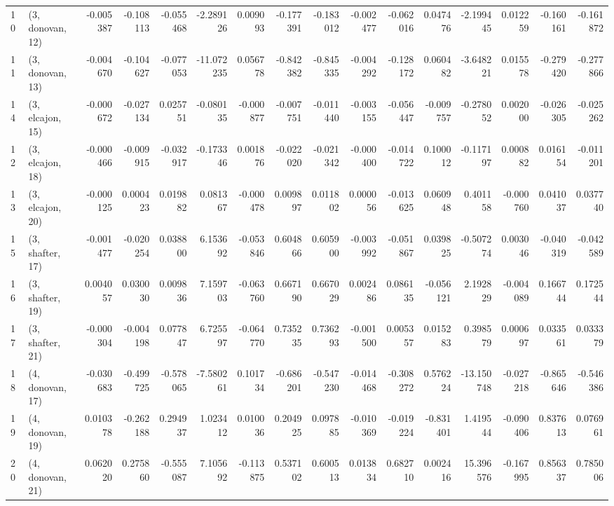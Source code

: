 \begin{tabular}{llrrrrrrrrrrrrrr}
10 &  (3, donovan, 12) &  -0.005387 & -0.108113 & -0.055468 &  -2.289126 &  0.009093 &  -0.177391 & -0.183012 & -0.002477 & -0.062016 &  0.047476 &  -2.199445 &  0.012259 & -0.160161 & -0.161872 \\
11 &  (3, donovan, 13) &  -0.004670 & -0.104627 & -0.077053 & -11.072235 &  0.056778 &  -0.842382 & -0.845335 & -0.004292 & -0.128172 &  0.060482 &  -3.648221 &  0.015578 & -0.279420 & -0.277866 \\
14 &  (3, elcajon, 15) &  -0.000672 & -0.027134 &  0.025751 &  -0.080135 & -0.000877 &  -0.007751 & -0.011440 & -0.003155 & -0.056447 & -0.009757 &  -0.278052 &  0.002000 & -0.026305 & -0.025262 \\
12 &  (3, elcajon, 18) &  -0.000466 & -0.009915 & -0.032917 &  -0.173346 &  0.001876 &  -0.022020 & -0.021342 & -0.000400 & -0.014722 &  0.100012 &  -0.117197 &  0.000882 &  0.016154 & -0.011201 \\
13 &  (3, elcajon, 20) &  -0.000125 &  0.000423 &  0.019882 &   0.081367 & -0.000478 &   0.009897 &  0.011802 &  0.000056 & -0.013625 &  0.060948 &   0.401158 & -0.000760 &  0.041037 &  0.037740 \\
15 &  (3, shafter, 17) &  -0.001477 & -0.020254 &  0.038800 &   6.153692 & -0.053846 &   0.604866 &  0.605900 & -0.003992 & -0.051867 &  0.039825 &  -0.507274 &  0.003046 & -0.040319 & -0.042589 \\
16 &  (3, shafter, 19) &   0.004057 &  0.030030 &  0.009836 &   7.159703 & -0.063760 &   0.667190 &  0.667029 &  0.002486 &  0.086135 & -0.056121 &   2.192829 & -0.004089 &  0.166744 &  0.172544 \\
17 &  (3, shafter, 21) &  -0.000304 & -0.004198 &  0.077847 &   6.725597 & -0.064770 &   0.735235 &  0.736293 & -0.001500 &  0.005357 &  0.015283 &   0.398579 &  0.000697 &  0.033561 &  0.033379 \\
18 &  (4, donovan, 17) &  -0.030683 & -0.499725 & -0.578065 &  -7.580261 &  0.101734 &  -0.686201 & -0.547230 & -0.014468 & -0.308272 &  0.576224 & -13.150748 & -0.027218 & -0.865646 & -0.546386 \\
19 &  (4, donovan, 19) &   0.010378 & -0.262188 &  0.294937 &   1.023412 &  0.010036 &   0.204925 &  0.097885 & -0.010369 & -0.019224 & -0.831401 &   1.419544 & -0.090406 &  0.837613 &  0.076961 \\
20 &  (4, donovan, 21) &   0.062020 &  0.275860 & -0.555087 &   7.105692 & -0.113875 &   0.537102 &  0.600513 &  0.013834 &  0.682710 &  0.002416 &  15.396576 & -0.167995 &  0.856337 &  0.785006 \\

\end{tabular}
